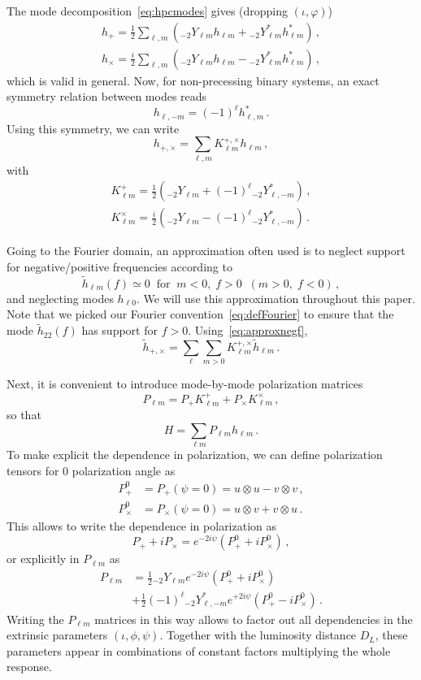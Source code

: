 \documentclass[aps,showpacs,twocolumn,prd,superscriptaddress,nofootinbib]{revtex4-1}
\newcommand{\be}{\begin{equation}}
\newcommand{\ee}{\end{equation}}
\newcommand{\bsub}{\begin{subequations}}
\newcommand{\esub}{\end{subequations}}
\newcommand{\nn}{\nonumber}
\newcommand{\sYlm}{{}_{-2}Y_{\ell m}}
\newcommand{\sYlmstar}{{}_{-2}Y_{\ell m}^{*}}
\newcommand{\sYlminusmstar}{{}_{-2}Y_{\ell, -m}^{*}}
\begin{document}
The mode decomposition~\eqref{eq:hpcmodes} gives (dropping $(\iota, \varphi)$)
\bsub
\begin{align}
	h_{+} = \frac{1}{2} \sum_{\ell, m} \left( \sYlm h_{\ell m} + \sYlmstar h_{\ell m}^{*} \right) \,,\\
	h_{\times} = \frac{i}{2} \sum_{\ell, m} \left( \sYlm h_{\ell m} - \sYlmstar h_{\ell m}^{*} \right) \,,
\end{align}
\esub
which is valid in general. Now, for non-precessing binary systems, an exact symmetry relation between modes reads
\be\label{eq:nonprecsymmetry}
	h_{\ell, -m} = (-1)^{\ell} h_{\ell, m}^{*} \,.
\ee
Using this symmetry, we can write
\be
	h_{+,\times} = \sum_{\ell, m} K_{\ell m}^{+, \times} h_{\ell m} \,, 
\ee
with
\bsub
\begin{align}
	K_{\ell m}^{+} =\frac{1}{2} \left( \sYlm + (-1)^{\ell} \sYlminusmstar \right) \,,\\
	K_{\ell m}^{\times} = \frac{i}{2} \left( \sYlm - (-1)^{\ell} \sYlminusmstar \right) \,.
\end{align}
\esub

Going to the Fourier domain, an approximation often used is to neglect support for negative/positive frequencies according to
\be\label{eq:approxnegf}
	\tilde{h}_{\ell m} (f) \simeq 0 \;\; \text{for} \;\; m<0, \; f>0 \;\; ( m>0, \; f<0 )\,,
\ee
and neglecting modes $h_{\ell 0}$. We will use this approximation throughout this paper. Note that we picked our Fourier convention~\eqref{eq:defFourier} to ensure that the mode $\tilde{h}_{22} (f)$ has support for $f>0$. Using~\eqref{eq:approxnegf},
\be
	\tilde{h}_{+,\times} = \sum_{\ell} \sum_{m>0} K_{\ell m}^{+, \times} \tilde{h}_{\ell m} \,.
\ee

Next, it is convenient to introduce mode-by-mode polarization matrices
\be
	P_{\ell m} = P_{+} K_{\ell m}^{+} + P_{\times} K_{\ell m}^{\times} \,,
\ee
so that
\be\label{eq:Hsummodes}
	H = \sum_{\ell m} P_{\ell m} h_{\ell m} \,.
\ee
To make explicit the dependence in polarization, we can define polarization tensors for 0 polarization angle as
\bsub
\begin{align}
	P_{+}^{0} &= P_{+}(\psi = 0) = u \otimes u - v \otimes v \,,\\
	P_{\times}^{0} &= P_{\times}(\psi = 0) = u \otimes v + v \otimes u \,.
\end{align}
\esub
This allows to write the dependence in polarization as
\be
	P_{+} + i P_{\times} = e^{-2 i \psi} \left( P_{+}^{0} + i P_{\times}^{0} \right) \,,
\ee
or explicitly in $P_{\ell m}$ as
\begin{align}
	P_{\ell m} &= \frac{1}{2} \sYlm e^{-2 i \psi} \left( P_{+}^{0} + i P_{\times}^{0} \right) \nn\\
	& + \frac{1}{2} (-1)^{\ell} \sYlminusmstar e^{+2 i \psi} \left( P_{+}^{0} - i P_{\times}^{0} \right) \,.
\end{align}
Writing the $P_{\ell m}$ matrices in this way allows to factor out all dependencies in the extrinsic parameters $(\iota, \phi, \psi)$. Together with the luminosity distance $D_{L}$, these parameters appear in combinations of constant factors multiplying the whole response.
\end{document}
